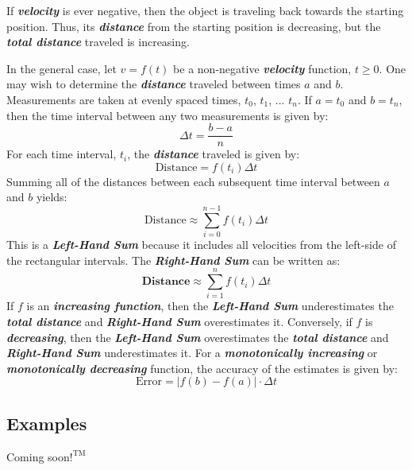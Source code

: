 \vspace{0.1in}
If \textbf{\textit{velocity}} is ever negative, then the object is traveling back towards the starting position. Thus, its \textbf{\textit{distance}} from the starting position is decreasing, but the \textbf{\textit{total distance}} traveled is increasing.

\vspace{0.1in}
In the general case, let $v = f(t)$ be a non-negative \textbf{\textit{velocity}} function, $t \geq 0$. One may wish to determine the \textbf{\textit{distance}} traveled between times $a$ and $b$. Measurements are taken at evenly spaced times, $t_0$, $t_1$, ... $t_n$. If $a = t_0$ and $b = t_n$, then the time interval between any two measurements is given by:
%
\begin{equation}
\Delta t = \frac{b - a}{n}
\end{equation}
%
For each time interval, $t_i$, the \textbf{\textit{distance}} traveled is given by:
%
\begin{equation}
\text{Distance} = f\left(t_i\right)\Delta t
\end{equation}
%
Summing all of the distances between each subsequent time interval between $a$ and $b$ yields:
%
\begin{equation}
\label{eq:LHSum}
\text{Distance} \approx \sum_{i=0}^{n-1} f\left(t_i\right)\Delta t
\end{equation}
%
This is a \textbf{\textit{Left-Hand Sum}} because it includes all velocities from the left-side of the rectangular intervals. The \textbf{\textit{Right-Hand Sum}} can be written as:
%
\begin{equation}
\label{eq:RHSum}
\textbf{Distance} \approx \sum_{i=1}^n f\left(t_i\right)\Delta t
\end{equation}
%
If $f$ is an \textbf{\textit{increasing function}}, then the \textbf{\textit{Left-Hand Sum}} underestimates the \textbf{\textit{total distance}} and \textbf{\textit{Right-Hand Sum}} overestimates it. Conversely, if $f$ is \textbf{\textit{decreasing}}, then the \textbf{\textit{Left-Hand Sum}} overestimates the \textbf{\textit{total distance}} and \textbf{\textit{Right-Hand Sum}} underestimates it. For a \textbf{\textit{monotonically increasing}} or \textbf{\textit{monotonically decreasing}} function, the accuracy of the estimates is given by:
%
\begin{equation}
\text{Error} = |f(b) - f(a)| \cdot \Delta t
\end{equation}
%

\begin{center}
\section*{\small Examples}
Coming soon$!^{\text{TM}}$
\end{center}

